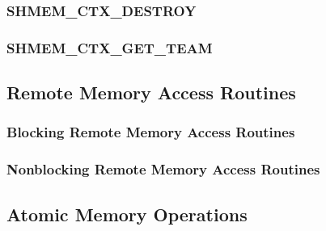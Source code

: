 \documentclass[10pt,oneside]{book}
\begin{document}
\subsubsection{\textbf{SHMEM\_CTX\_DESTROY}}
\label{subsec:shmem_ctx_destroy}


\subsubsection{\textbf{SHMEM\_CTX\_GET\_TEAM}}
\label{subsec:shmem_ctx_get_team}


\subsection{Remote Memory Access Routines}\label{sec:rma}


\subsubsection{Blocking Remote Memory Access Routines}\label{subsec:rma}
\label{subsec:shmem_put}


\label{subsec:shmem_p}


\label{subsec:shmem_iput}


\label{subsec:shmem_get}


\label{subsec:shmem_g}


\label{subsec:shmem_iget}


\subsubsection{Nonblocking Remote Memory Access Routines}\label{subsec:rma_nbi}

\label{subsec:shmem_put_nbi}


\label{subsec:shmem_get_nbi}




\subsection{Atomic Memory Operations}\label{sec:amo}

\end{document}

